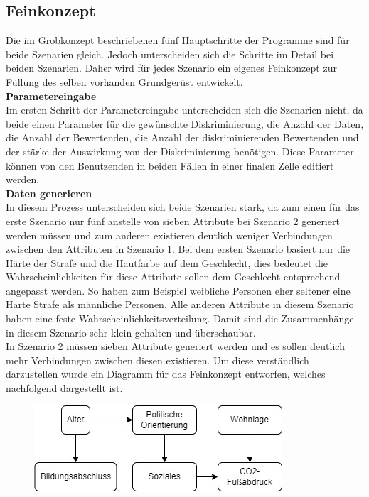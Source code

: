 \begin{onehalfspace}
\subsection{Feinkonzept}
\label{subsubsec:feinkonzept}
Die im Grobkonzept beschriebenen fünf Hauptschritte der Programme sind für beide Szenarien gleich. Jedoch unterscheiden sich die Schritte im Detail bei beiden Szenarien. Daher wird für jedes Szenario ein eigenes Feinkonzept zur Füllung des selben vorhanden Grundgerüst entwickelt.\\
\textbf{Parametereingabe}\\
Im ersten Schritt der Parametereingabe unterscheiden sich die Szenarien nicht, da beide einen Parameter für die gewünschte Diskriminierung, die Anzahl der Daten, die Anzahl der Bewertenden, die Anzahl der diskriminierenden Bewertenden und der stärke der Auswirkung von der Diskriminierung benötigen. Diese Parameter können von den Benutzenden in beiden Fällen in einer finalen Zelle editiert werden.\\
\textbf{Daten generieren}\\
In diesem Prozess unterscheiden sich beide Szenarien stark, da zum einen für das erste Szenario nur fünf anstelle von sieben Attribute bei Szenario 2 generiert werden müssen und zum anderen existieren deutlich weniger Verbindungen zwischen den Attributen in Szenario 1. Bei dem ersten Szenario basiert nur die Härte der Strafe und die Hautfarbe auf dem Geschlecht, dies bedeutet die Wahrscheinlichkeiten für diese Attribute sollen dem Geschlecht entsprechend angepasst werden. So haben zum Beispiel weibliche Personen eher seltener eine Harte Strafe als männliche Personen. Alle anderen Attribute in diesem Szenario haben eine feste Wahrscheinlichkeitsverteilung. Damit sind die Zusammenhänge in diesem Szenario sehr klein gehalten und überschaubar.\\
In Szenario 2 müssen sieben Attribute generiert werden und es sollen deutlich mehr Verbindungen zwischen diesen existieren. Um diese verständlich darzustellen wurde ein Diagramm für das Feinkonzept entworfen, welches nachfolgend dargestellt ist.\\
\begin{figure}[h]
    \centering
    \includegraphics{Diagramme/Verbindung_der_Attribute_S2.jpg}

\end{figure}
\end{onehalfspace}
